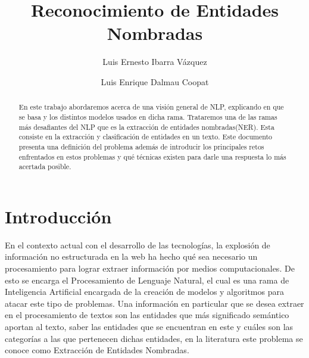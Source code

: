 \documentclass[runningheads]{llncs}
\begin{document}
%
\title{Reconocimiento de Entidades Nombradas}
%
%
\author{Luis Ernesto Ibarra Vázquez \and
Luis Enrique Dalmau Coopat}
%
%
%
\maketitle              %
%
\begin{abstract}

En este trabajo abordaremos acerca de una visión general de NLP, explicando en que se basa y los distintos modelos usados en dicha rama. Trataremos una de las ramas más desafiantes del NLP que es la extracción de entidades nombradas(NER). Esta consiste en la extracción y clasificación de entidades en un texto. Este documento presenta una definición del problema además de introducir los principales retos enfrentados en estos problemas y qué técnicas existen para darle una respuesta lo más acertada posible. 

\end{abstract}
%
%
%
\section{Introducción}

En el contexto actual con el desarrollo de las tecnologías, la explosión de información no estructurada en la web ha hecho qué sea necesario un procesamiento para lograr extraer información por medios computacionales. De esto se encarga el Procesamiento de Lenguaje Natural, el cual es una rama de Inteligencia Artificial encargada de la creación de modelos y algoritmos para atacar este tipo de problemas. Una información en particular que se desea extraer en el procesamiento de textos son las entidades que más significado semántico aportan al texto, saber las entidades que se encuentran en este y cuáles son las categorías a las que pertenecen dichas entidades, en la literatura este problema se conoce como Extracción de Entidades Nombradas.
\end{document}
